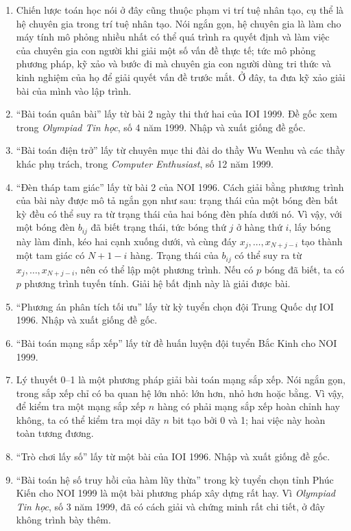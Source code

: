\documentclass[11pt]{article}
\begin{document}
\begin{enumerate}
  \item Chiến lược toán học nói ở đây cũng thuộc phạm vi trí tuệ nhân tạo,
  cụ thể là hệ chuyên gia trong trí tuệ nhân tạo. Nói ngắn gọn, hệ chuyên gia
  là làm cho máy tính mô phỏng nhiều nhất có thể quá trình ra quyết định và
  làm việc của chuyên gia con người khi giải một số vấn đề thực tế; tức mô
  phỏng phương pháp, kỹ xảo và bước đi mà chuyên gia con người dùng tri thức
  và kinh nghiệm của họ để giải quyết vấn đề trước mắt. Ở đây, ta đưa kỹ xảo
  giải bài của mình vào lập trình.

  \item ``Bài toán quân bài'' lấy từ bài 2 ngày thi thứ hai của IOI 1999. Đề
  gốc xem trong \textit{Olympiad Tin học}, số 4 năm 1999. Nhập và xuất giống
  đề gốc.

  \item ``Bài toán điện trở'' lấy từ chuyên mục thi đài do thầy Wu Wenhu và
  các thầy khác phụ trách, trong \textit{Computer Enthusiast}, số 12 năm
  1999.

  \item ``Đèn tháp tam giác'' lấy từ bài 2 của NOI 1996. Cách giải bằng
  phương trình của bài này được mô tả ngắn gọn như sau: trạng thái của một
  bóng đèn bất kỳ đều có thể suy ra từ trạng thái của hai bóng đèn phía dưới
  nó. Vì vậy, với một bóng đèn \(b_{ij}\) đã biết trạng thái, tức bóng thứ
  \(j\) ở hàng thứ \(i\), lấy bóng này làm đỉnh, kéo hai cạnh xuống dưới, và
  cùng đáy \(x_j,\ldots,x_{N+j-i}\) tạo thành một tam giác có \(N+1-i\) hàng.
  Trạng thái của \(b_{ij}\) có thể suy ra từ
  \(x_j,\ldots,x_{N+j-i}\), nên có thể lập một phương trình. Nếu có \(p\) bóng
  đã biết, ta có \(p\) phương trình tuyến tính. Giải hệ bất định này là giải
  được bài.

  \item ``Phương án phân tích tối ưu'' lấy từ kỳ tuyển chọn đội Trung Quốc
  dự IOI 1996. Nhập và xuất giống đề gốc.

  \item ``Bài toán mạng sắp xếp'' lấy từ đề huấn luyện đội tuyển Bắc Kinh cho
  NOI 1999.

  \item Lý thuyết 0--1 là một phương pháp giải bài toán mạng sắp xếp. Nói
  ngắn gọn, trong sắp xếp chỉ có ba quan hệ lớn nhỏ: lớn hơn, nhỏ hơn hoặc
  bằng. Vì vậy, để kiểm tra một mạng sắp xếp \(n\) hàng có phải mạng sắp xếp
  hoàn chỉnh hay không, ta có thể kiểm tra mọi dãy \(n\) bit tạo bởi 0 và 1;
  hai việc này hoàn toàn tương đương.

  \item ``Trò chơi lấy số'' lấy từ một bài của IOI 1996. Nhập và xuất giống
  đề gốc.

  \item ``Bài toán hệ số truy hồi của hàm lũy thừa'' trong kỳ tuyển chọn tỉnh
  Phúc Kiến cho NOI 1999 là một bài phương pháp xây dựng rất hay. Vì
  \textit{Olympiad Tin học}, số 3 năm 1999, đã có cách giải và chứng minh
  rất chi tiết, ở đây không trình bày thêm.
\end{enumerate}
\end{document}
